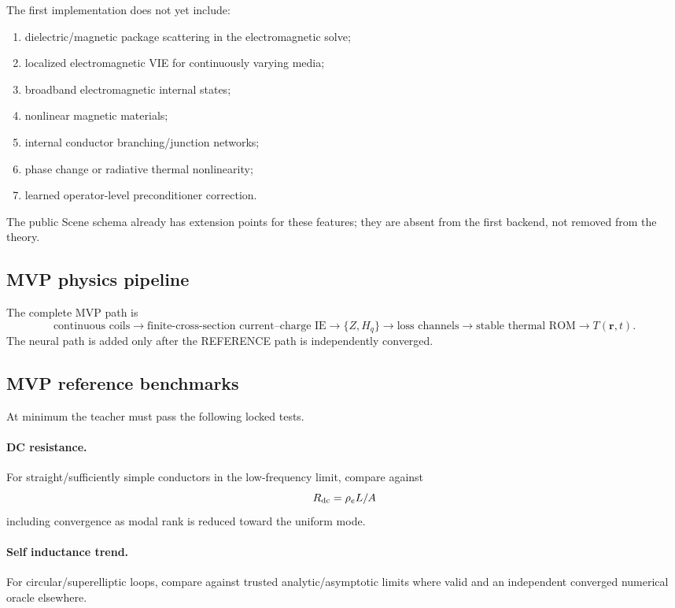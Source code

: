 The first implementation does not yet include:
\begin{enumerate}
\item dielectric/magnetic package scattering in the electromagnetic solve;
\item localized electromagnetic VIE for continuously varying media;
\item broadband electromagnetic internal states;
\item nonlinear magnetic materials;
\item internal conductor branching/junction networks;
\item phase change or radiative thermal nonlinearity;
\item learned operator-level preconditioner correction.
\end{enumerate}
The public Scene schema already has extension points for these features; they
are absent from the first backend, not removed from the theory.

\subsection{MVP physics pipeline}

The complete MVP path is
\[
 \text{continuous coils}
 \rightarrow
 \text{finite-cross-section current--charge IE}
 \rightarrow
 \{Z,H_q\}
 \rightarrow
 \text{loss channels}
 \rightarrow
 \text{stable thermal ROM}
 \rightarrow
 T(\mathbf r,t).
\]
The neural path is added only after the REFERENCE path is independently
converged.

\subsection{MVP reference benchmarks}

At minimum the teacher must pass the following locked tests.

\paragraph{DC resistance.}
For straight/sufficiently simple conductors in the low-frequency limit, compare
against
\[
 R_{\rm dc}=\rho_e L/A
\]
including convergence as modal rank is reduced toward the uniform mode.

\paragraph{Self inductance trend.}
For circular/superelliptic loops, compare against trusted analytic/asymptotic
limits where valid and an independent converged numerical oracle elsewhere.

